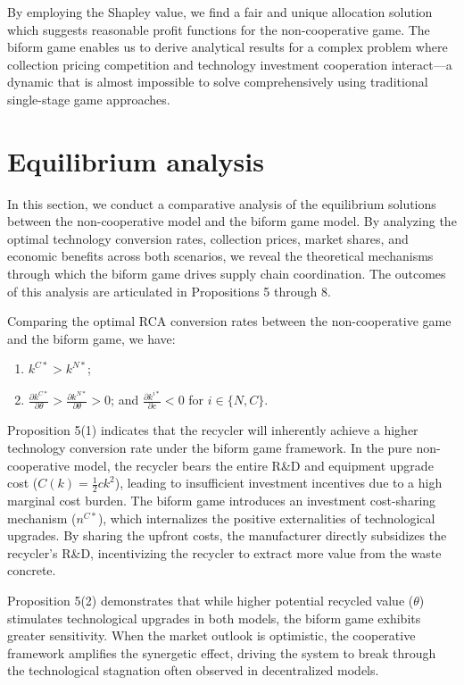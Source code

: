 \documentclass[authoryear,preprint,review,times,10pt]{elsarticle}
\begin{document}
By employing the Shapley value, we find a fair and unique allocation solution which suggests reasonable profit functions for the non-cooperative game. The biform game enables us to derive analytical results for a complex problem where collection pricing competition and technology investment cooperation interact—a dynamic that is almost impossible to solve comprehensively using traditional single-stage game approaches.

\section{Equilibrium analysis}
\label{sec:equilibrium_analysis}
In this section, we conduct a comparative analysis of the equilibrium solutions between the non-cooperative model and the biform game model. By analyzing the optimal technology conversion rates, collection prices, market shares, and economic benefits across both scenarios, we reveal the theoretical mechanisms through which the biform game drives supply chain coordination. The outcomes of this analysis are articulated in Propositions 5 through 8.


\begin{prop}
\label{prop:technology_comparison}
Comparing the optimal RCA conversion rates between the non-cooperative game and the biform game, we have:
\begin{enumerate}[label={(\arabic*)}]
\item $k^{C*} > k^{N*}$;
\item $\frac{\partial k^{C*}}{\partial \theta} > \frac{\partial k^{N*}}{\partial \theta} > 0$; and $\frac{\partial k^{i*}}{\partial c} < 0$ for $i \in \{N, C\}$.
\end{enumerate}
\end{prop}

Proposition 5(1) indicates that the recycler will inherently achieve a higher technology conversion rate under the biform game framework. In the pure non-cooperative model, the recycler bears the entire R\&D and equipment upgrade cost ($C(k) = \frac{1}{2}ck^2$), leading to insufficient investment incentives due to a high marginal cost burden. The biform game introduces an investment cost-sharing mechanism ($n^{C*}$), which internalizes the positive externalities of technological upgrades. By sharing the upfront costs, the manufacturer directly subsidizes the recycler's R\&D, incentivizing the recycler to extract more value from the waste concrete.

Proposition 5(2) demonstrates that while higher potential recycled value ($\theta$) stimulates technological upgrades in both models, the biform game exhibits greater sensitivity. When the market outlook is optimistic, the cooperative framework amplifies the synergetic effect, driving the system to break through the technological stagnation often observed in decentralized models.
\end{document}
